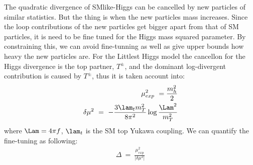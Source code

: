 The quadratic divergence of SMlike-Higgs can be cancelled by new particles of similar statistics. 
But the thing is when the new particles mass increases.
Since the loop contributions of the new particles get bigger apart from that of SM particles, 
it is need to be fine tuned for the Higgs mass squared parameter. 
By constraining this, we can avoid fine-tunning as well as give upper bounds how heavy the new particles are. 
For the Littlest Higgs model the cancellon for the Higgs divergence is the top partner, $T^\pm$, and
the dominant log-divergent contribution is caused by $T^\pm$, 
thus it is taken account into:
\begin{align}
 \mu_{exp}^2~=\frac{m_h^2}{2} \nonumber \\
 \delta \mu^2~=~ -\frac{3 \lam_t m_T^2}{8\pi^2}\log\frac{\Lam^2}{m_T^2}
\end{align}
where $\Lam=4\pi f$, $\lam_t$ is the SM top Yukawa coupling. 
We can quantify the fine-tuning as following:
\begin{align}
 \Delta~=~\frac{\mu_{exp}^2}{|\delta \mu^2|}
\end{align}


% 
% 
% 
% 

